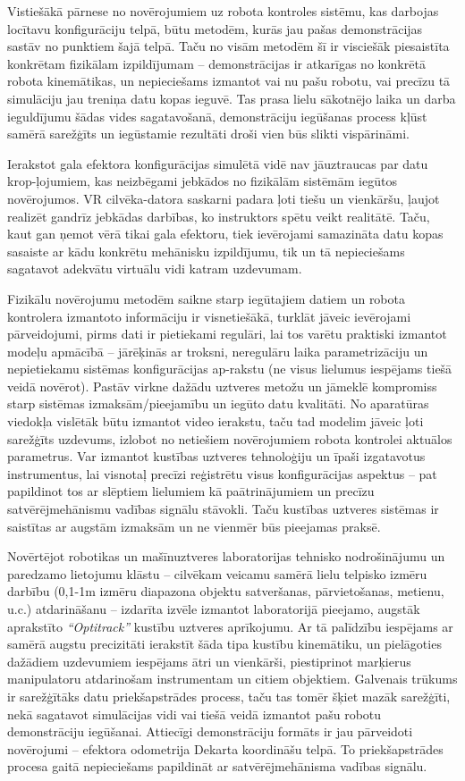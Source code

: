 \documentclass[12pt, a4paper]{article}
\numberwithin{equation}{section} %
\begin{document}
Vistiešākā pārnese no novērojumiem uz robota kontroles sistēmu, kas darbojas locītavu konfigurāciju telpā, būtu metodēm, kurās jau pašas demonstrācijas sastāv no punktiem šajā telpā. Taču no visām metodēm šī ir visciešāk piesaistīta konkrētam fizikālam izpildījumam -- demonstrācijas ir atkarīgas no konkrētā robota kinemātikas, un nepieciešams izmantot vai nu pašu robotu, vai precīzu tā simulāciju jau treniņa datu kopas ieguvē. Tas prasa lielu sākotnējo laika un darba ieguldījumu šādas vides sagatavošanā, demonstrāciju iegūšanas process kļūst samērā sarežģīts un iegūstamie rezultāti droši vien būs slikti vispārināmi.

Ierakstot gala efektora konfigurācijas simulētā vidē nav jāuztraucas par datu krop-ļojumiem, kas neizbēgami jebkādos no fizikālām sistēmām iegūtos novērojumos. VR cilvēka-datora saskarni padara ļoti tiešu un vienkāršu, ļaujot realizēt gandrīz jebkādas darbības, ko instruktors spētu veikt realitātē. Taču, kaut gan ņemot vērā tikai gala efektoru, tiek ievērojami samazināta datu kopas sasaiste ar kādu konkrētu mehānisku izpildījumu, tik un tā nepieciešams sagatavot adekvātu virtuālu vidi katram uzdevumam.

Fizikālu novērojumu metodēm saikne starp iegūtajiem datiem un robota kontrolera izmantoto informāciju ir visnetiešākā, turklāt jāveic ievērojami pārveidojumi, pirms dati ir pietiekami regulāri, lai tos varētu praktiski izmantot modeļu apmācībā -- jārēķinās ar troksni, neregulāru laika parametrizāciju un nepietiekamu sistēmas konfigurācijas ap-rakstu (ne visus lielumus iespējams tiešā veidā novērot). Pastāv virkne dažādu uztveres metožu un jāmeklē kompromiss starp sistēmas izmaksām/pieejamību un iegūto datu kvalitāti. No aparatūras viedokļa vislētāk būtu izmantot video ierakstu, taču tad modelim jāveic ļoti sarežģīts uzdevums, izlobot no netiešiem novērojumiem robota kontrolei aktuālos parametrus. Var izmantot kustības uztveres tehnoloģiju un īpaši izgatavotus instrumentus, lai visnotaļ precīzi reģistrētu visus konfigurācijas aspektus -- pat papildinot tos ar slēptiem lielumiem kā paātrinājumiem un precīzu satvērējmehānismu vadības signālu stāvokli. Taču kustības uztveres sistēmas ir saistītas ar augstām izmaksām un ne vienmēr būs pieejamas praksē.

Novērtējot robotikas un mašīnuztveres laboratorijas tehnisko nodrošinājumu un paredzamo lietojumu klāstu -- cilvēkam veicamu samērā lielu telpisko izmēru darbību (0,1-1m izmēru diapazona objektu satveršanas, pārvietošanas, metienu, u.c.) atdarināšanu -- izdarīta izvēle izmantot laboratorijā pieejamo, augstāk aprakstīto \textit{``Optitrack''} kustību uztveres aprīkojumu. Ar tā palīdzību iespējams ar samērā augstu precizitāti ierakstīt šāda tipa kustību kinemātiku, un pielāgoties dažādiem uzdevumiem iespējams ātri un vienkārši, piestiprinot marķierus manipulatoru atdarinošam instrumentam un citiem objektiem. Galvenais trūkums ir sarežģītāks datu priekšapstrādes process, taču tas tomēr šķiet mazāk sarežģīti, nekā sagatavot simulācijas vidi vai tiešā veidā izmantot pašu robotu demonstrāciju iegūšanai. Attiecīgi demonstrāciju formāts ir jau pārveidoti novērojumi -- efektora odometrija Dekarta koordināšu telpā. To priekšapstrādes procesa gaitā nepieciešams papildināt ar satvērējmehānisma vadības signālu.
\end{document}
